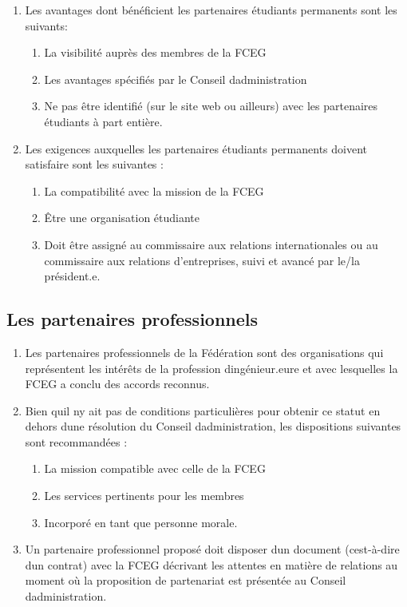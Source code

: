 \begin{enumerate}
 \item
  Les avantages dont bénéficient les partenaires étudiants permanents sont les suivants:

  \begin{enumerate}
   \item
    La visibilité auprès des membres de la FCEG
   \item
    Les avantages spécifiés par le Conseil d\textquotesingle administration
   \item
    Ne pas être identifié (sur le site web ou ailleurs) avec les partenaires étudiants à part entière.
  \end{enumerate}
 \item
  Les exigences auxquelles les partenaires étudiants permanents doivent satisfaire sont les suivantes :

  \begin{enumerate}
   \item
    La compatibilité avec la mission de la FCEG
   \item
    Être une organisation étudiante
   \item
    Doit être assigné au commissaire aux relations internationales ou au commissaire aux relations d'entreprises, suivi et avancé par le/la président.e.
  \end{enumerate}
\end{enumerate}

\subsection{Les partenaires professionnels}
\label{les-partenaires-professionnels}

\begin{enumerate}
 \item
  Les partenaires professionnels de la Fédération sont des organisations qui représentent les intérêts de la profession d\textquotesingle ingénieur.eure et avec lesquelles la FCEG a conclu des accords reconnus.
 \item
  Bien qu\textquotesingle il n\textquotesingle y ait pas de conditions particulières pour obtenir ce statut en dehors d\textquotesingle une résolution du Conseil d\textquotesingle administration, les dispositions suivantes sont recommandées :

  \begin{enumerate}
   \item
    La mission compatible avec celle de la FCEG
   \item
    Les services pertinents pour les membres
   \item
    Incorporé en tant que personne morale.
  \end{enumerate}
 \item
  Un partenaire professionnel proposé doit disposer d\textquotesingle un document (c\textquotesingle est-à-dire d\textquotesingle un contrat) avec la FCEG décrivant les attentes en matière de relations au moment où la proposition de partenariat est présentée au Conseil d\textquotesingle administration.
\end{enumerate}

